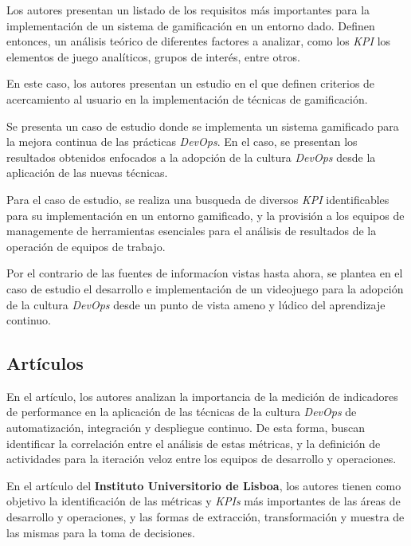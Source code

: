 \documentclass[journal]{IEEEtran}
\begin{document}
\cite{heilbrunn2014towards} Los autores presentan un listado de los requisitos más importantes para la implementación de un sistema de gamificación en un entorno dado. Definen entonces, un análisis teórico de diferentes factores a analizar, como los \textit{KPI} los elementos de juego analíticos, grupos de interés, entre otros.

\cite{meng2014gamification} En este caso, los autores presentan un estudio en el que definen criterios de acercamiento al usuario en la implementación de técnicas de gamificación.

\cite{ayoup2022achievement} Se presenta un caso de estudio donde se implementa un sistema gamificado para la mejora continua de las prácticas \textit{DevOps}. En el caso, se presentan los resultados obtenidos enfocados a la adopción de la cultura \textit{DevOps} desde la aplicación de las nuevas técnicas.

\cite{palenvcarova2022goal} Para el caso de estudio, se realiza una busqueda de diversos \textit{KPI} identificables para su implementación en un entorno gamificado, y la provisión a los equipos de managemente de herramientas esenciales para el análisis de resultados de la operación de equipos de trabajo.

\cite{grande2023serious} Por el contrario de las fuentes de informacíon vistas hasta ahora, se plantea en el caso de estudio el desarrollo e implementación de un videojuego para la adopción de la cultura \textit{DevOps} desde un punto de vista ameno y lúdico del aprendizaje continuo.

\subsection{\textbf{\large Artículos}}

\cite{brunnert2015performance} En el artículo, los autores analizan la importancia de la medición de indicadores de performance en la aplicación de las técnicas de la cultura \textit{DevOps} de automatización, integración y despliegue continuo. De esta forma, buscan identificar la correlación entre el análisis de estas métricas, y la definición de actividades para la iteración veloz entre los equipos de desarrollo y operaciones.

\cite{amaro2024devops} En el artículo del \textbf{Instituto Universitorio de Lisboa}, los autores tienen como objetivo la identificación de las métricas y \textit{KPIs} más importantes de las áreas de desarrollo y operaciones, y las formas de extracción, transformación y muestra de las mismas para la toma de decisiones.
\end{document}
